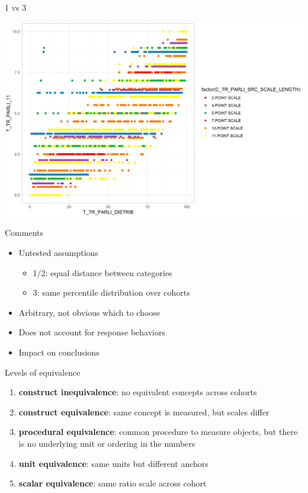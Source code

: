\documentclass[ignorenonframetext,aspectratio=43]{beamer}
\providecommand{\tightlist}{%
  \setlength{\itemsep}{0pt}\setlength{\parskip}{0pt}}
\begin{document}
\begin{frame}{1 vs 3}
\protect\hypertarget{vs-3}{}

\includegraphics{figures/scatter2.png}

\end{frame}

\begin{frame}{Comments}
\protect\hypertarget{comments}{}

\begin{itemize}
\tightlist
\item
  Untested assumptions

  \begin{itemize}
  \tightlist
  \item
    1/2: equal distance between categories
  \item
    3: same percentile distribution over cohorts
  \end{itemize}
\item
  Arbitrary, not obvious which to choose
\item
  Does not account for response behaviors
\item
  Impact on conclusions
\end{itemize}

\end{frame}

\begin{frame}{Levels of equivalence}
\protect\hypertarget{levels-of-equivalence}{}

\begin{enumerate}
\tightlist
\item
  \textbf{construct inequivalence}: no equivalent concepts across
  cohorts
\item
  \textbf{construct equivalence}: same concept is measured, but scales
  differ
\item
  \textbf{procedural equivalence}: common procedure to measure objects,
  but there is no underlying unit or ordering in the numbers
\item
  \textbf{unit equivalence}: same units but different anchors
\item
  \textbf{scalar equivalence}: same ratio scale across cohort
\end{enumerate}

\end{frame}
\end{document}
